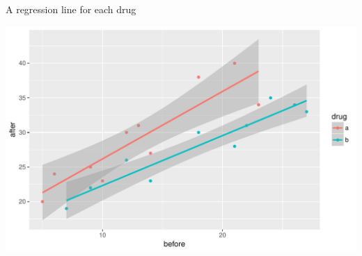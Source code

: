 \begin{frame}[fragile]{A regression line for each drug}

\begin{knitrout}
\color{fgcolor}\begin{kframe}
\begin{alltt}
\hlstd{(}\hlopt{+}
  \hlstd{()}\hlopt{+}\hlstd{(}\hlstd{=}\hlstd{)}
\end{alltt}
\end{kframe}
\includegraphics[width=\maxwidth]{figure/kalloni-1} 

\end{knitrout}
  
\end{frame}



